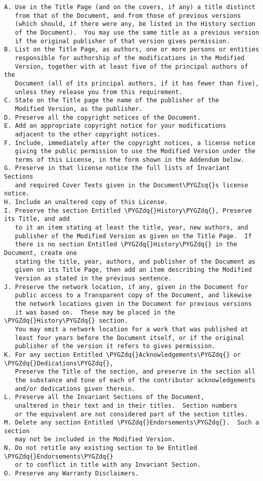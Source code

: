 \documentclass[letterpaper,10pt,english]{sphinxmanual}
\def\PYGZsq{\char`\'}
\def\PYGZdq{\char`\"}
\renewcommand\PYGZsq{\textquotesingle}
\begin{document}
\begin{Verbatim}[frame=single,commandchars=\\\{\}]
A. Use in the Title Page (and on the covers, if any) a title distinct
   from that of the Document, and from those of previous versions
   (which should, if there were any, be listed in the History section
   of the Document).  You may use the same title as a previous version
   if the original publisher of that version gives permission.
B. List on the Title Page, as authors, one or more persons or entities
   responsible for authorship of the modifications in the Modified
   Version, together with at least five of the principal authors of the
   Document (all of its principal authors, if it has fewer than five),
   unless they release you from this requirement.
C. State on the Title page the name of the publisher of the
   Modified Version, as the publisher.
D. Preserve all the copyright notices of the Document.
E. Add an appropriate copyright notice for your modifications
   adjacent to the other copyright notices.
F. Include, immediately after the copyright notices, a license notice
   giving the public permission to use the Modified Version under the
   terms of this License, in the form shown in the Addendum below.
G. Preserve in that license notice the full lists of Invariant Sections
   and required Cover Texts given in the Document\PYGZsq{}s license notice.
H. Include an unaltered copy of this License.
I. Preserve the section Entitled \PYGZdq{}History\PYGZdq{}, Preserve its Title, and add
   to it an item stating at least the title, year, new authors, and
   publisher of the Modified Version as given on the Title Page.  If
   there is no section Entitled \PYGZdq{}History\PYGZdq{} in the Document, create one
   stating the title, year, authors, and publisher of the Document as
   given on its Title Page, then add an item describing the Modified
   Version as stated in the previous sentence.
J. Preserve the network location, if any, given in the Document for
   public access to a Transparent copy of the Document, and likewise
   the network locations given in the Document for previous versions
   it was based on.  These may be placed in the \PYGZdq{}History\PYGZdq{} section.
   You may omit a network location for a work that was published at
   least four years before the Document itself, or if the original
   publisher of the version it refers to gives permission.
K. For any section Entitled \PYGZdq{}Acknowledgements\PYGZdq{} or \PYGZdq{}Dedications\PYGZdq{},
   Preserve the Title of the section, and preserve in the section all
   the substance and tone of each of the contributor acknowledgements
   and/or dedications given therein.
L. Preserve all the Invariant Sections of the Document,
   unaltered in their text and in their titles.  Section numbers
   or the equivalent are not considered part of the section titles.
M. Delete any section Entitled \PYGZdq{}Endorsements\PYGZdq{}.  Such a section
   may not be included in the Modified Version.
N. Do not retitle any existing section to be Entitled \PYGZdq{}Endorsements\PYGZdq{}
   or to conflict in title with any Invariant Section.
O. Preserve any Warranty Disclaimers.


\end{Verbatim}
\end{document}
